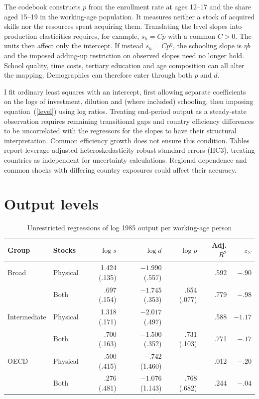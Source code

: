 \documentclass[11pt]{article}
\begin{document}
The codebook constructs $p$ from the enrollment rate at ages 12--17 and the share aged 15--19 in the working-age population. It measures neither a stock of acquired skills nor the resources spent acquiring them. Translating the level slopes into production elasticities requires, for example, $s_h=Cp$ with a common $C>0$. The units then affect only the intercept. If instead $s_h=Cp^\eta$, the schooling slope is $\eta b$ and the imposed adding-up restriction on observed slopes need no longer hold. School quality, time costs, tertiary education and age composition can all alter the mapping. Demographics can therefore enter through both $p$ and $d$.

I fit ordinary least squares with an intercept, first allowing separate coefficients on the logs of investment, dilution and (where included) schooling, then imposing equation~(\ref{level}) using log ratios. Treating end-period output as a steady-state observation requires remaining transitional gaps and country efficiency differences to be uncorrelated with the regressors for the slopes to have their structural interpretation. Common efficiency growth does not ensure this condition. Tables report leverage-adjusted heteroskedasticity-robust standard errors (HC3), treating countries as independent for uncertainty calculations. Regional dependence and common shocks with differing country exposures could affect their accuracy.

\section{Output levels}
\begin{table}[ht]
\centering\small
\caption{Unrestricted regressions of log 1985 output per working-age person}\label{levtab}
\begin{tabular}{llrrrrr}
\toprule
Group&Stocks&$\log s$&$\log d$&$\log p$&Adj. $R^2$&$z_{\Sigma}$\\
\midrule
Broad&Physical&1.424 (.135)&$-1.990$ (.557)& &.592&$-.90$\\
&Both&.697 (.154)&$-1.745$ (.353)&.654 (.077)&.779&$-.98$\\
Intermediate&Physical&1.318 (.171)&$-2.017$ (.497)& &.588&$-1.17$\\
&Both&.700 (.163)&$-1.500$ (.352)&.731 (.103)&.771&$-.17$\\
OECD&Physical&.500 (.415)&$-.742$ (1.460)& &.012&$-.20$\\
&Both&.276 (.481)&$-1.076$ (1.143)&.768 (.682)&.244&$-.04$\\
\bottomrule
\end{tabular}
\end{table}
\end{document}
